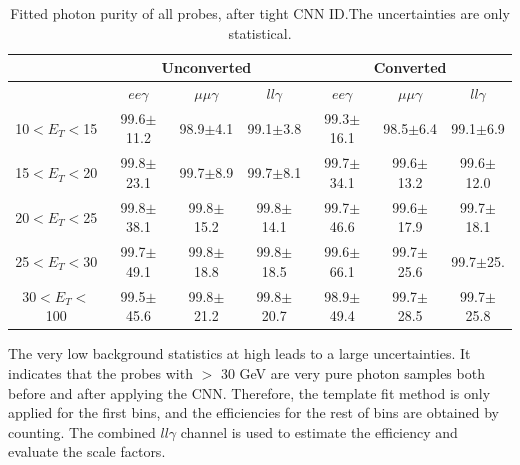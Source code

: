 \begin{table}[htbp]
\raggedleft
\begin{longtable}[c]{ccccccc}
\hline\hline
                             & \multicolumn{3}{c}{Unconverted}               & \multicolumn{3}{c}{Converted}                \\
                            \hline
\endfirsthead
%
\endhead
%
                             & $ee\gamma$           & $\mu\mu\gamma$           & $ll\gamma$           & $ee\gamma$           &  $\mu\mu\gamma$          & $ll\gamma$           \\
    \hline
10$<E_T<$15 & 99.6$\pm$11.2    & 98.9$\pm$4.1       & 99.1$\pm$3.8    & 99.3$\pm$16.1    & 98.5$\pm$6.4     & 99.1$\pm$6.9  \\
15$<E_T<$20 & 99.8$\pm$23.1    & 99.7$\pm$8.9       & 99.7$\pm$8.1    & 99.7$\pm$34.1    & 99.6$\pm$13.2    & 99.6$\pm$12.0 \\
20$<E_T<$25 & 99.8$\pm$38.1    & 99.8$\pm$15.2      & 99.8$\pm$14.1   & 99.7$\pm$46.6    & 99.6$\pm$17.9    & 99.7$\pm$18.1  \\
25$<E_T<$30  & 99.7$\pm$49.1   & 99.8$\pm$18.8      & 99.8$\pm$18.5   & 99.6$\pm$66.1    & 99.7$\pm$25.6    & 99.7$\pm$25.    \\
30$<E_T<$100 & 99.5$\pm$45.6   & 99.8$\pm$21.2      & 99.8$\pm$20.7   & 98.9$\pm$49.4    & 99.7$\pm$28.5    & 99.7$\pm$25.8     \\
\hline\hline
\end{longtable}
\caption{Fitted photon purity of all probes, after tight CNN ID.The uncertainties are only statistical.}
\label{tab:gamma:CNN:Zllg:Purity:A}
\end{table}
The very low background statistics at high \pT leads to a large uncertainties. It indicates that the probes with \pT$>$ 30 GeV are very pure photon samples both before and after applying the CNN. Therefore, the template fit method is only applied for the first \pT bins, and the efficiencies for the rest of bins are obtained by counting. The combined $ll\gamma$ channel is used to estimate the efficiency and evaluate the scale factors.   

